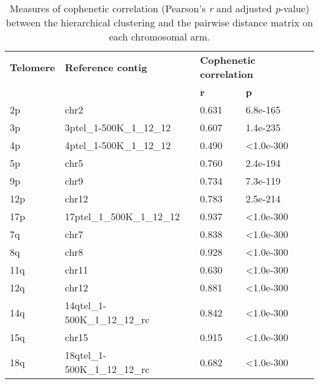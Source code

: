 \begin{samepage} \begin{table}[h!] \small \begin{tabular}{llll}
\hline
\textbf{Telomere} & \textbf{Reference contig}       & \multicolumn{2}{l}{\textbf{Cophenetic correlation}} \\
\textbf{}         & \textbf{}                       & \textbf{r} & \textbf{p}  \\
\hline
2p                &  chr2                           &  0.631     &  6.8e-165   \\
3p                &  3ptel\_1-500K\_1\_12\_12       &  0.607     &  1.4e-235   \\
4p                &  4ptel\_1-500K\_1\_12\_12       &  0.490     &  <1.0e-300  \\
5p                &  chr5                           &  0.760     &  2.4e-194   \\
9p                &  chr9                           &  0.734     &  7.3e-119   \\
12p               &  chr12                          &  0.783     &  2.5e-214   \\
17p               &  17ptel\_1\_500K\_1\_12\_12     &  0.937     &  <1.0e-300  \\
7q                &  chr7                           &  0.838     &  <1.0e-300  \\
8q                &  chr8                           &  0.928     &  <1.0e-300  \\
11q               &  chr11                          &  0.630     &  <1.0e-300  \\
12q               &  chr12                          &  0.881     &  <1.0e-300  \\
14q               &  14qtel\_1-500K\_1\_12\_12\_rc  &  0.842     &  <1.0e-300  \\
15q               &  chr15                          &  0.915     &  <1.0e-300  \\
18q               &  18qtel\_1-500K\_1\_12\_12\_rc  &  0.682     &  <1.0e-300  \\
\hline
\end{tabular}
\caption{
    \small Measures of cophenetic correlation (Pearson's \textit{r} and adjusted \textit{p}-value)
    between the hierarchical clustering and the pairwise distance matrix on each chromosomal arm.
}
\label{tab:cophenetic}
\end{table}
\end{samepage}
